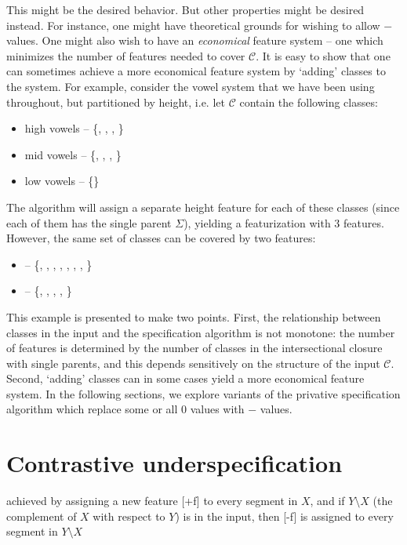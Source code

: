 \documentclass[11pt, oneside]{article}   	%
\begin{document}
This might be the desired behavior. But other properties might be desired instead. For instance, one might have theoretical grounds for wishing to allow $-$ values. One might also wish to have an \textit{economical} feature system -- one which minimizes the number of features needed to cover $\mathcal C$. It is easy to show that one can sometimes achieve a more economical  feature system by `adding' classes to the system. For example, consider the vowel system that we have been using throughout, but partitioned by height, i.e. let $\mathcal C$ contain the following classes: \begin{itemize}
    \item high vowels -- \{, , , \}
    \item mid vowels -- \{, \textipa{\oe}, , \}
    \item low vowels -- \{\}
    \end{itemize}
The algorithm will assign a separate height feature for each of these classes (since each of them has the single parent $\Sigma$), yielding a featurization with 3 features. However, the same set of classes can be covered by two features: \begin{itemize}
    \item {} -- \{, , , , , \textipa{\oe}, , \}
    \item {} -- \{, \textipa{\oe}, , , \}
    \end{itemize}
This example is presented to make two points. First, the relationship between classes in the input and the specification algorithm is not monotone: the number of features is determined by the number of classes in the intersectional closure with single parents, and this depends sensitively on the structure of the input $\mathcal C$. Second, `adding' classes can in some cases yield a more economical feature system. In the following sections, we explore variants of the privative specification algorithm which replace some or all $0$ values with $-$ values.

\section{Contrastive underspecification}
achieved by assigning a new feature [+f] to every segment in $X$, and if $Y \setminus X$ (the complement of $X$ with respect to $Y$) is in the input, then [-f] is assigned to every segment in $Y \setminus X$
\end{document}
